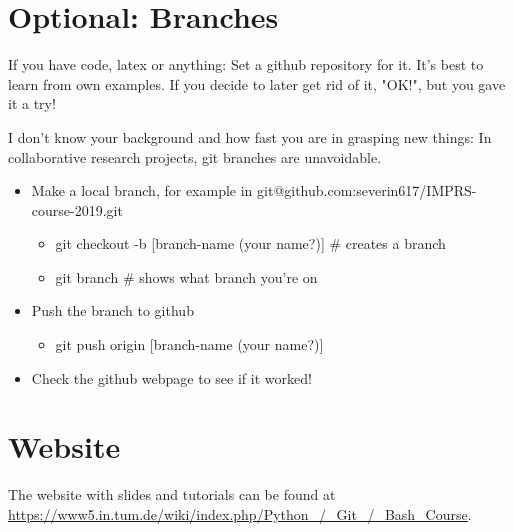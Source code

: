\documentclass[11pt]{article}
\begin{document}
\section*{Optional: Branches}
If you have code, latex or anything: Set a github repository for it. It's best to learn from own examples. If you decide to later get rid of it, "OK!", but you gave it a try!
 
I don't know your background and how fast you are in grasping new things: In collaborative research projects, git branches are unavoidable.
\begin{itemize}
\item Make a local branch, for example in git@github.com:severin617/IMPRS-course-2019.git
\begin{itemize}
\item[] git checkout -b [branch-name (your name?)] \# creates a branch
\item[] git branch \# shows what branch you're on 
\end{itemize}
\item Push the branch to github
\begin{itemize}
\item[] git push origin [branch-name (your name?)]
\end{itemize}
\item Check the github webpage to see if it worked!
\end{itemize}



\section*{Website}
\label{sec:Website}
The website with slides and tutorials can be found at\\
\url{https://www5.in.tum.de/wiki/index.php/Python_/_Git_/_Bash_Course}.
\end{document}
